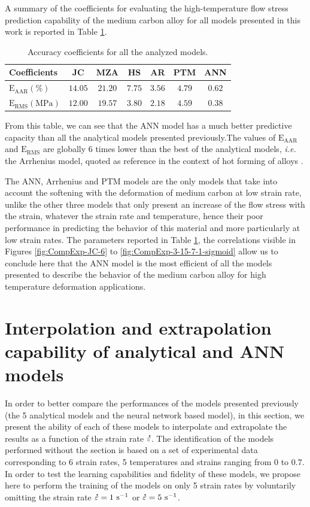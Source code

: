 \documentclass[twoside,english,1p,final,sort&compress]{elsarticle}
\makeatletter
\theoremstyle{plain}
\DeclareRobustCommand{\mdot}[1]{\accentset{\mbox{\bfseries .}}{#1}}
\DeclareRobustCommand{\ie}{\emph{i.e.}\@\xspace}
\DeclareRobustCommand{\RMSE}{\text{E}_\text{RMS}}
\DeclareRobustCommand{\AARE}{\text{E}_\text{AAR}}
\DeclareRobustCommand{\ps}{\text{s}^{-1}}
\DeclareRobustCommand{\MPa}{\text{MPa}}
\makeatother
\begin{document}
A summary of the coefficients for evaluating the high-temperature flow stress prediction capability of the medium carbon alloy for all models presented in this work is reported in Table \ref{tab:Errors}.
\begin{table}[h!]
\centering
\caption{Accuracy coefficients for all the analyzed models.}
\begin{tabular}{lcccccc}
	\hline
	Coefficients        &   JC    &   MZA   &   HS   &   AR   &  PTM   &  ANN   \\ \hline
	$\AARE(\%)$         & $14.05$ & $21.20$ & $7.75$ & $3.56$ & $4.79$ & $0.62$ \\
	$\RMSE(\MPa)$ & $12.00$ & $19.57$ & $3.80$ & $2.18$ & $4.59$ & $0.38$ \\ \hline
\end{tabular}
\label{tab:Errors}
\end{table}
From this table, we can see that the ANN model has a much better predictive capacity than all the analytical models presented previously.The values of $\AARE$ and $\RMSE$ are globally 6 times lower than the best of the analytical models, \ie the Arrhenius model, quoted as reference in the context of hot forming of alloys \cite{Liang-2022}.

The ANN, Arrhenius and PTM models are the only models that take into account the softening with the deformation of medium carbon at low strain rate, unlike the other three models that only present an increase of the flow stress with the strain, whatever the strain rate and temperature, hence their poor performance in predicting the behavior of this material and more particularly at low strain rates.
The parameters reported in Table \ref{tab:Errors}, the correlations visible in Figures \ref{fig:CompExp-JC-6} to \ref{fig:CompExp-3-15-7-1-sigmoid} allow us to conclude here that the ANN model is the most efficient of all the models presented to describe the behavior of the medium carbon alloy for high temperature deformation applications.

\section{Interpolation and extrapolation capability of analytical and ANN models \label{sec:IntExt}}

In order to better compare the performances of the models presented previously (the 5 analytical models and the neural network based model), in this section, we present the ability of each of these models to interpolate and extrapolate the results as a function of the strain rate $\mdot\varepsilon$.
The identification of the models performed without the section is based on a set of experimental data corresponding to 6 strain rates, 5 temperatures and strains ranging from $0$ to $0.7$.
In order to test the learning capabilities and fidelity of these models, we propose here to perform the training of the models on only 5 strain rates by voluntarily omitting the strain rate $\mdot\varepsilon=1~\ps$ or $\mdot\varepsilon=5~\ps$.
\end{document}
